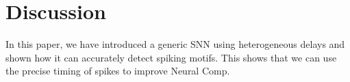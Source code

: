 \documentclass[runningheads]{llncs}
\newcommand{\fig}[1]{Fig.~\ref{fig:#1}}%
\begin{document}

%
\section{Discussion}
%
In this paper, we have introduced a generic SNN using heterogeneous delays and shown how it can accurately detect spiking motifs. This shows that we can use the precise timing of spikes to improve Neural Comp. 
%
\end{document}
